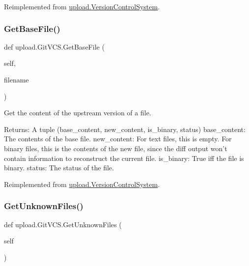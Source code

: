 Reimplemented from \mbox{\hyperlink{classupload_1_1VersionControlSystem_adfd9d4ecba422102233a2ba13e5bfaf5}{upload.\+Version\+Control\+System}}.

\mbox{\label{classupload_1_1GitVCS_a70ddb65a6b512b8cb8cc4affa37ff9b4}} 
\subsubsection{\texorpdfstring{GetBaseFile()}{GetBaseFile()}\hspace{0.1cm}{\footnotesize\ttfamily [2/2]}}
{\footnotesize\ttfamily def upload.\+Git\+V\+C\+S.\+Get\+Base\+File (\begin{DoxyParamCaption}\item[{}]{self,  }\item[{}]{filename }\end{DoxyParamCaption})}

\begin{DoxyVerb}Get the content of the upstream version of a file.

Returns:
  A tuple (base_content, new_content, is_binary, status)
base_content: The contents of the base file.
new_content: For text files, this is empty.  For binary files, this is
  the contents of the new file, since the diff output won't contain
  information to reconstruct the current file.
is_binary: True iff the file is binary.
status: The status of the file.
\end{DoxyVerb}
 

Reimplemented from \mbox{\hyperlink{classupload_1_1VersionControlSystem_adfd9d4ecba422102233a2ba13e5bfaf5}{upload.\+Version\+Control\+System}}.

\mbox{\label{classupload_1_1GitVCS_ae4e8c0e9fa01619c6a5c76d1ab84b995}} 
\subsubsection{\texorpdfstring{GetUnknownFiles()}{GetUnknownFiles()}\hspace{0.1cm}{\footnotesize\ttfamily [1/2]}}
{\footnotesize\ttfamily def upload.\+Git\+V\+C\+S.\+Get\+Unknown\+Files (\begin{DoxyParamCaption}\item[{}]{self }\end{DoxyParamCaption})}

